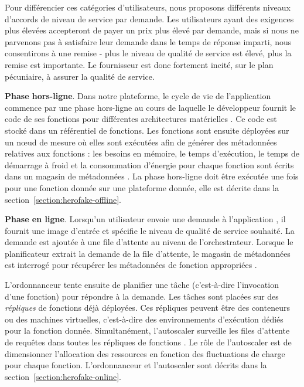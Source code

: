 Pour différencier ces catégories d'utilisateurs, nous proposons différents niveaux d'accords de niveau de service par demande. Les utilisateurs ayant des exigences plus élevées accepteront de payer un prix plus élevé par demande, mais si nous ne parvenons pas à satisfaire leur demande dans le temps de réponse imparti, nous consentirons à une remise - plus le niveau de qualité de service est élevé, plus la remise est importante. Le fournisseur est donc fortement incité, sur le plan pécuniaire, à assurer la qualité de service.

\textbf{Phase hors-ligne}. Dans notre plateforme, le cycle de vie de l'application commence par une phase hors-ligne au cours de laquelle le développeur fournit le code de ses fonctions pour différentes architectures matérielles . Ce code est stocké dans un référentiel de fonctions. Les fonctions sont ensuite déployées sur un nœud de mesure  où elles sont exécutées afin de générer des métadonnées relatives aux fonctions : les besoins en mémoire, le temps d'exécution, le temps de démarrage à froid et la consommation d'énergie pour chaque fonction sont écrits dans un magasin de métadonnées . La phase hors-ligne doit être exécutée une fois pour une fonction donnée sur une plateforme donnée, elle est décrite dans la section~\ref{section:herofake-offline}.

\textbf{Phase en ligne}. Lorsqu'un utilisateur envoie une demande à l'application , il fournit une image d'entrée et spécifie le niveau de qualité de service souhaité. La demande est ajoutée à une file d'attente  au niveau de l'orchestrateur. Lorsque le planificateur extrait la demande de la file d'attente, le magasin de métadonnées est interrogé pour récupérer les métadonnées de fonction appropriées .

L'ordonnanceur tente ensuite de planifier une tâche (c'est-à-dire l'invocation d'une fonction) pour répondre à la demande. Les tâches sont placées sur des \textit{répliques} de fonctions  déjà déployées. Ces répliques peuvent être des conteneurs ou des machines virtuelles, c'est-à-dire des environnements d'exécution dédiés pour la fonction donnée.
Simultanément, l'autoscaler surveille les files d'attente de requêtes dans toutes les répliques de fonctions . Le rôle de l'autoscaler est de dimensionner l'allocation des ressources en fonction des fluctuations de charge pour chaque fonction.
L'ordonnanceur et l'autoscaler sont décrits dans la section~\ref{section:herofake-online}.

